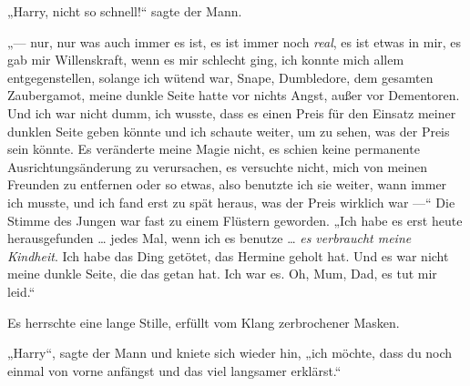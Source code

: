 „Harry, nicht so schnell!“ sagte der Mann.

„— nur, nur was auch immer es ist, es ist immer noch \emph{real}, es ist etwas in mir, es gab mir Willenskraft, wenn es mir schlecht ging, ich konnte mich allem entgegenstellen, solange ich wütend war, Snape, Dumbledore, dem gesamten Zaubergamot, meine dunkle Seite hatte vor nichts Angst, außer vor Dementoren. Und ich war nicht dumm, ich wusste, dass es einen Preis für den Einsatz meiner dunklen Seite geben könnte und ich schaute weiter, um zu sehen, was der Preis sein könnte. Es veränderte meine Magie nicht, es schien keine permanente Ausrichtungsänderung zu verursachen, es versuchte nicht, mich von meinen Freunden zu entfernen oder so etwas, also benutzte ich sie weiter, wann immer ich musste, und ich fand erst zu spät heraus, was der Preis wirklich war —“
Die Stimme des Jungen war fast zu einem Flüstern geworden.
„Ich habe es erst heute herausgefunden … jedes Mal, wenn ich es benutze … \emph{es verbraucht meine Kindheit}. Ich habe das Ding getötet, das Hermine geholt hat. Und es war nicht meine dunkle Seite, die das getan hat. Ich war es. Oh, Mum, Dad, es tut mir leid.“

Es herrschte eine lange Stille, erfüllt vom Klang zerbrochener Masken.

„Harry“, sagte der Mann und kniete sich wieder hin, „ich möchte, dass du noch einmal von vorne anfängst und das viel langsamer erklärst.“

